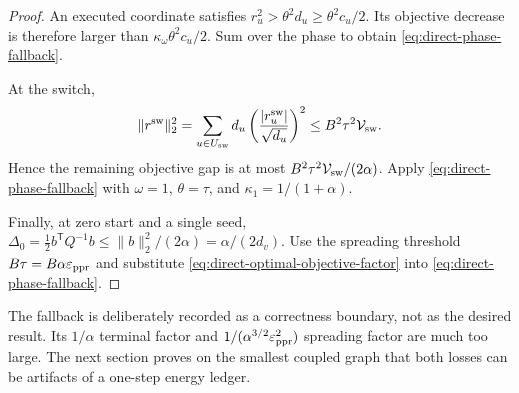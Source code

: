 \begin{proof}
An executed coordinate satisfies
$r_u^2>\theta^2d_u\geq\theta^2c_u/2$. Its objective decrease is therefore
larger than $\kappa_\omega\theta^2c_u/2$. Sum over the phase to obtain
\cref{eq:direct-phase-fallback}.

At the switch,
\begin{equation*}
 \|r^{\rm sw}\|_2^2
 =\sum_{u\in U_{\rm sw}}d_u
   \left(\frac{|r_u^{\rm sw}|}{\sqrt{d_u}}\right)^2
 \leq B^2\tau^2\mathcal V_{\rm sw}.
\end{equation*}
Hence the remaining objective gap is at most
$B^2\tau^2\mathcal V_{\rm sw}/(2\alpha)$. Apply
\cref{eq:direct-phase-fallback} with $\omega=1$, $\theta=\tau$, and
$\kappa_1=1/(1+\alpha)$.

Finally, at zero start and a single seed,
$\Delta_0=\frac12b^\mathsf TQ^{-1}b\leq\|b\|_2^2/(2\alpha)
=\alpha/(2d_v)$. Use the spreading threshold $B\tau=B\alpha\varepsilon_{\mathrm{ppr}}$ and
substitute \cref{eq:direct-optimal-objective-factor} into
\cref{eq:direct-phase-fallback}.
\end{proof}

The fallback is deliberately recorded as a correctness boundary, not as the
desired result. Its $1/\alpha$ terminal factor and
$1/(\alpha^{3/2}\varepsilon_{\mathrm{ppr}}^2)$ spreading factor are much too large. The next
section proves on the smallest coupled graph that both losses can be artifacts
of a one-step energy ledger.
